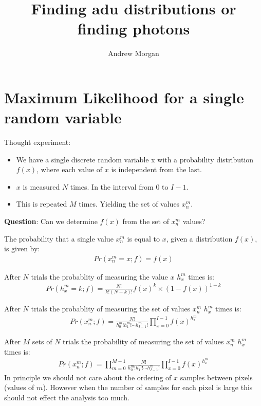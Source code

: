 \documentclass[11pt]{article}
\title{\textbf{Finding adu distributions or finding photons}}
\author{Andrew Morgan}
\date{}
\begin{document}
\maketitle

\section{Maximum Likelihood for a single random variable}
Thought experiment:

\begin{itemize}

  \item We have a single discrete random variable x with a probability distribution $f(x)$, where each value of $x$ is independent from the last. 
  \item $x$ is measured $N$ times. In the interval from $0$ to $I-1$.
  \item This is repeated $M$ times. Yielding the set of values $x^m_n$.

\end{itemize}

\textbf{Question}: Can we determine $f(x)$ from the set of $x^m_n$ values?

The probability that a single value $x^m_n$ is equal to $x$, given a distribution $f(x)$, is given by:
\begin{align}
   Pr(x^m_n = x; f) = f(x)
\end{align}

After $N$ trials the probablity of measuring the value $x$ $h^m_x$ times is:
\begin{align}
   Pr(h^m_x = k; f) = \frac{N!}{k!(N-k)!} f(x)^k \times (1-f(x))^{1-k}
\end{align}

After $N$ trials the probablity of measuring the set of values $x^m_n$ $h^m_x$ times is:
\begin{align}
   Pr(x^m_n; f) = \frac{N!}{h^m_0! h^m_1! \cdots h^m_{I-1}!} \prod_{x=0}^{I-1} f(x)^{h^m_{x}}
\end{align}


After $M$ sets of $N$ trials the probability of measuring the set of values $x^m_n$ $h^m_x$ times is:
\begin{align}
   Pr(x^m_n; f) = \prod_{m=0}^{M-1}\frac{N!}{h^m_0! h^m_1! \cdots h^m_{I-1}!} \prod_{x=0}^{I-1} f(x)^{h^m_{x}}
\end{align}
In principle we should not care about the ordering of $x$ samples between pixels (values of $m$). However when the number of samples for each pixel is large this should not effect the analysis too much. 
\end{document}
